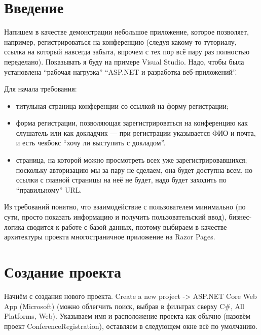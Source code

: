 \documentclass{../../text-style}
\begin{document}
\maketitle
\thispagestyle{empty}

\section{Введение}

Напишем в качестве демонстрации небольшое приложение, которое позволяет, например, регистрироваться на конференцию (следуя какому-то туториалу, ссылка на который навсегда забыта, впрочем с тех пор всё пару раз полностью переделано). Показывать я буду на примере Visual Studio. Надо, чтобы была установлена \enquote{рабочая нагрузка} \enquote{ASP.NET и разработка веб-приложений}.

Для начала требования:

\begin{itemize}
    \item титульная страница конференции со ссылкой на форму регистрации;
    \item форма регистрации, позволяющая зарегистрироваться на конференцию как слушатель или как докладчик --- при регистрации указывается ФИО и почта, и есть чекбокс \enquote{хочу ли выступить с докладом}.
    \item страница, на которой можно просмотреть всех уже зарегистрировавшихся; поскольку авторизацию мы за пару не сделаем, она будет доступна всем, но ссылки с главной страницы на неё не будет, надо будет заходить по \enquote{правильному} URL.
\end{itemize}

Из требований понятно, что взаимодействие с пользователем минимально (по сути, просто показать информацию и получить пользовательский ввод), бизнес-логика сводится к работе с базой данных, поэтому выбираем в качестве архитектуры проекта многостраничное приложение на Razor Pages.

\section{Создание проекта}

Начнём с создания нового проекта. Create a new project -> ASP.NET Core Web App (Microsoft) (можно облегчить поиск, выбрав в фильтрах сверху C\#, All Platforms, Web). Указываем имя и расположение проекта как обычно (назовём проект ConferenceRegistration), оставляем в следующем окне всё по умолчанию.
\end{document}
